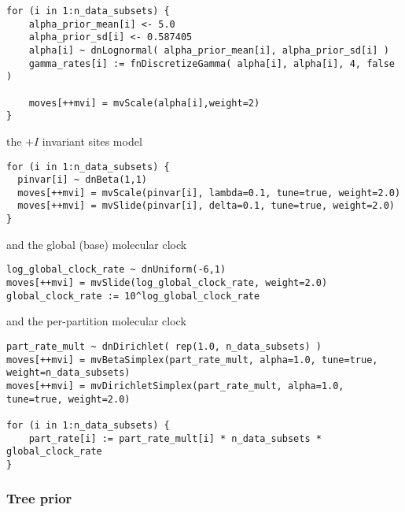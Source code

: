 {\tt \small \begin{snugshade*}
\begin{lstlisting}
for (i in 1:n_data_subsets) {
    alpha_prior_mean[i] <- 5.0
    alpha_prior_sd[i] <- 0.587405
    alpha[i] ~ dnLognormal( alpha_prior_mean[i], alpha_prior_sd[i] )
    gamma_rates[i] := fnDiscretizeGamma( alpha[i], alpha[i], 4, false )

    moves[++mvi] = mvScale(alpha[i],weight=2)
}
\end{lstlisting}
\end{snugshade*}}

the $+I$ invariant sites model

{\tt \small \begin{snugshade*}
\begin{lstlisting}
for (i in 1:n_data_subsets) {
  pinvar[i] ~ dnBeta(1,1)
  moves[++mvi] = mvScale(pinvar[i], lambda=0.1, tune=true, weight=2.0)
  moves[++mvi] = mvSlide(pinvar[i], delta=0.1, tune=true, weight=2.0)
}
\end{lstlisting}
\end{snugshade*}}

and the global (\IE base) molecular clock
{\tt \small \begin{snugshade*}
\begin{lstlisting}
log_global_clock_rate ~ dnUniform(-6,1)
moves[++mvi] = mvSlide(log_global_clock_rate, weight=2.0)
global_clock_rate := 10^log_global_clock_rate
\end{lstlisting}
\end{snugshade*}}

and the per-partition molecular clock
{\tt \small \begin{snugshade*}
\begin{lstlisting}
part_rate_mult ~ dnDirichlet( rep(1.0, n_data_subsets) )
moves[++mvi] = mvBetaSimplex(part_rate_mult, alpha=1.0, tune=true, weight=n_data_subsets)
moves[++mvi] = mvDirichletSimplex(part_rate_mult, alpha=1.0, tune=true, weight=2.0)

for (i in 1:n_data_subsets) {
    part_rate[i] := part_rate_mult[i] * n_data_subsets * global_clock_rate
}
\end{lstlisting}
\end{snugshade*}}

\subsubsection{Tree prior}

